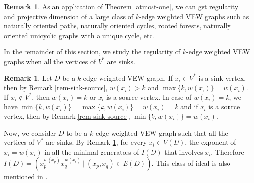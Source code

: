 \documentclass[11pt,reqno]{amsart}
\theoremstyle{definition}
\newtheorem{remark}[theorem]{Remark}
\begin{document}
\begin{remark}
	As an application of Theorem \ref{atmost-one},  we  can get regularity and projective dimension of a large class of $k$-edge weighted VEW graphs such as naturally oriented paths, naturally oriented cycles, rooted forests, naturally oriented unicyclic graphs with a unique cycle, etc.
\end{remark}
In the remainder of this section, we study the regularity of $k$-edge weighted VEW graphs when all the vertices of $ V^* $ are sinks. 
\begin{remark}\label{equalweight}
Let $ D $ be a $k$-edge weighted VEW graph.  If $x_i \in V^*$ is a sink vertex, then by Remark \ref{rem-sink-source}, $w(x_i) > k$ and  $ \max\{k,w(x_i)\} = w(x_i)$. If $x_i \notin V^*$, then $w(x_i)=k$ or $x_i$ is a source vertex.
In case of $w(x_i)=k$, we have $\min\{k,w(x_i)\} = \max\{k,w(x_i)\} = w(x_i) = k$ and if $x_i$ is a source vertex, then by Remark \ref{rem-sink-source}, $\min\{k,w(x_i)\} = w(x_i)$.
\end{remark}
\hspace*{0.5cm}Now, we consider $ D $ to be a $k$-edge weighted VEW graph such that all the vertices of $ V^* $ are sinks. By Remark \ref{equalweight}, for every $x_i \in V(D)$,  the exponent of $x_i = w(x_i)$ in all the minimal generators of $I(D)$ that involves $x_i$. Therefore
$I(D)  =  (x_p^{w(x_p)} x_q^{w(x_q)}~|~(x_p,x_q) \in E(D) ).$  This class of ideal is also mentioned in \cite[Question 5.20]{kara}.
\end{document}
